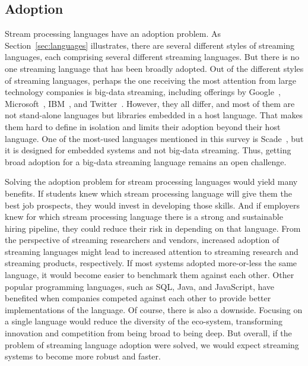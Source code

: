 \subsection{Adoption}\label{sec:adoption} %

Stream processing languages have an adoption problem. As
Section~\ref{sec:languages} illustrates, there are several different
styles of streaming languages, each comprising several different
streaming languages. But there is no one streaming language that has
been broadly adopted. Out of the different styles of streaming languages,
perhaps the one receiving the most attention from large technology
companies is big-data streaming, including offerings by
Google~\cite{akidau_et_al_2013}, Microsoft~\cite{ali_et_al_2009},
IBM~\cite{hirzel_schneider_gedik_2017}, and
Twitter~\cite{toshniwal_et_al_2014}. However, they all differ, and
most of them are not stand-alone languages but libraries embedded in a
host language. That makes them hard to define in isolation and limits
their adoption beyond their host language.  One of the most-used languages
mentioned in this survey is Scade~\cite{scade_2017}, but it is designed for
embedded systems and not big-data streaming. Thus, getting broad
adoption for a big-data streaming language remains an open challenge.

Solving the adoption problem for stream processing languages would
yield many benefits. If students knew which stream processing language
will give them the best job prospects, they would invest in developing
those skills. And if employers knew for which stream processing
language there is a strong and sustainable hiring pipeline, they could
reduce their risk in depending on that language.  From the perspective
of streaming researchers and vendors, increased adoption of streaming
languages might lead to increased attention to streaming research and
streaming products, respectively. If most systems adopted more-or-less
the same language, it would become easier to benchmark them against
each other. Other popular programming languages, such as SQL, Java,
and JavaScript, have benefited when companies competed against each
other to provide better implementations of the language.  Of course,
there is also a downside. Focusing on a single language would reduce
the diversity of the eco-system, transforming innovation and
competition from being broad to being deep. But overall, if the
problem of streaming language adoption were solved, we would expect
streaming systems to become more robust and faster.

